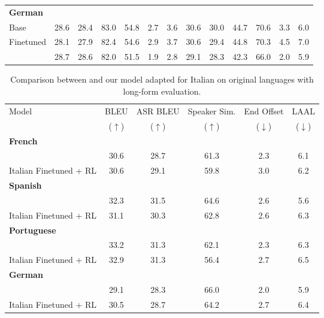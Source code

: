 \begin{table}[t]
\begin{center}
\begin{sc}
{\begin{tabular}{lcccccccccccc}
    \midrule
    \textbf{German} \\
    Base
        & 28.6 & 28.4 & 83.0 & 54.8 & 2.7 & 3.6
        & 30.6 & 30.0 & 44.7 & 70.6 & 3.3 & 6.0 \\
    Finetuned
        & 28.1 & 27.9 & 82.4 & 54.6 & 2.9 & 3.7
        & 30.6 & 29.4 & 44.8 & 70.3 & 4.5 & 7.0 \\
    \ours{}
        & 28.7 & 28.6 & 82.0 & 51.5 & 1.9 & 2.8
        & 29.1 & 28.3 & 42.3 & 66.0 & 2.0 & 5.9 \\
        
    \bottomrule
    \end{tabular}}
    \end{sc}
    \end{center}
\end{table}

\begin{table}[t]
    \caption{Comparison between \ours{} and our model adapted for Italian on original languages with long-form evaluation.}
    \label{tab:italian_results_longform}
    \begin{center}
    \setlength{\tabcolsep}{4pt}
    \begin{sc}
    \begin{tabular}{lccccc}
    \toprule
    
    \multirow{2}{*}{Model} & BLEU         & ASR BLEU     & Speaker Sim. & End Offset     & LAAL \\
                           & ($\uparrow$) & ($\uparrow$) & ($\uparrow$) & ($\downarrow$) & ($\downarrow$) \\
    
    \midrule
    \textbf{French} \\
    \ours{}
        & 30.6 & 28.7 & 61.3 & 2.3 & 6.1 \\  %
    Italian Finetuned + RL
        & 30.6 & 29.1 & 59.8 & 3.0 & 6.2 \\  %
    
    \midrule
    \textbf{Spanish} \\
    \ours{}
        & 32.3 & 31.5 & 64.6 & 2.6 & 5.6 \\
    Italian Finetuned + RL
        & 31.1 & 30.3 & 62.8 & 2.6 & 6.3 \\
    
    \midrule
    \textbf{Portuguese} \\
    \ours{}
        & 33.2 & 31.3 & 62.1 & 2.3 & 6.3 \\
    Italian Finetuned + RL
        & 32.9 & 31.3 & 56.4 & 2.7 & 6.5 \\
    
    \midrule
    \textbf{German} \\
    \ours{}
        & 29.1 & 28.3 & 66.0 & 2.0 & 5.9 \\
    Italian Finetuned + RL
        & 30.5 & 28.7 & 64.2 & 2.7 & 6.4 \\
    
    \bottomrule
    \end{tabular}
    \end{sc}
    \end{center}
\end{table}
